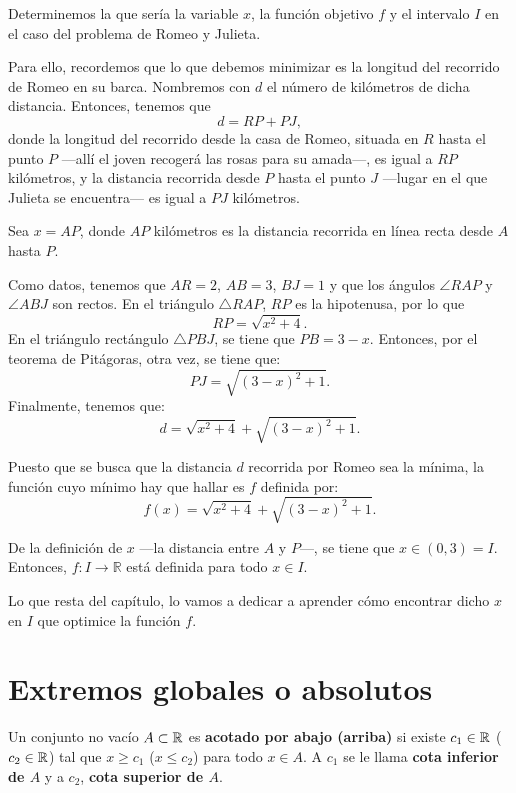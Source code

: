 Determinemos la que sería la variable $x$, la función objetivo $f$ y el intervalo $I$ en el caso
del problema de Romeo y Julieta.

Para ello, recordemos que lo que debemos minimizar es la longitud del recorrido de Romeo en su
barca. Nombremos con $d$ el número de kilómetros de dicha distancia. Entonces, tenemos que
\[
d = RP + PJ,
\]
donde la longitud del recorrido desde la casa de Romeo, situada en $R$ hasta el punto $P$ ---allí
el joven recogerá las rosas para su amada---, es igual a $RP$ kilómetros, y la distancia recorrida
desde $P$ hasta el punto $J$ ---lugar en el que Julieta se encuentra--- es igual a $PJ$ kilómetros.

Sea $x = AP$, donde $AP$ kilómetros es la distancia recorrida en línea recta desde $A$ hasta $P$.

Como datos, tenemos que $AR = 2$, $AB = 3$, $BJ = 1$ y que los ángulos $\angle RAP$ y $\angle ABJ$
son rectos. En el triángulo $\triangle RAP$, $RP$ es la hipotenusa, por lo que
\[
RP = \sqrt{x^2 + 4}.
\]
En el triángulo rectángulo $\triangle PBJ$, se tiene que $PB = 3 - x$. Entonces, por el teorema de
Pitágoras, otra vez, se tiene que:
\[
PJ = \sqrt{(3 - x)^2 + 1}.
\]
Finalmente, tenemos que:
\[
d = \sqrt{x^2 + 4} + \sqrt{(3 - x)^2 + 1}.
\]

Puesto que se busca que la distancia $d$ recorrida por Romeo sea la mínima, la función cuyo mínimo
hay que hallar es $f$ definida por:
\[
f(x) = \sqrt{x^2 + 4} + \sqrt{(3 - x)^2 + 1}.
\]

De la definición de $x$ ---la distancia entre $A$ y $P$---, se tiene que $x\in (0,3) = I$.
Entonces, $f\colon I \longrightarrow \mathbb{R}$ está definida para todo $x\in I$.

Lo que resta del capítulo, lo vamos a dedicar a aprender cómo encontrar dicho $x$ en $I$ que
optimice la función $f$.

\section{Extremos globales o absolutos}

\begin{defical}
Un conjunto no vacío $A\subset \mathbb{R}$ es \textbf{acotado por abajo (arriba)} si existe $c_1\in\mathbb{R}$
($c_2\in\mathbb{R}$) tal que $x \geq c_1$ ($x \leq c_2$) para todo $x\in A$. A $c_1$ se le llama
\textbf{cota inferior de $A$} y a $c_2$, \textbf{cota superior de $A$}.
\end{defical}

